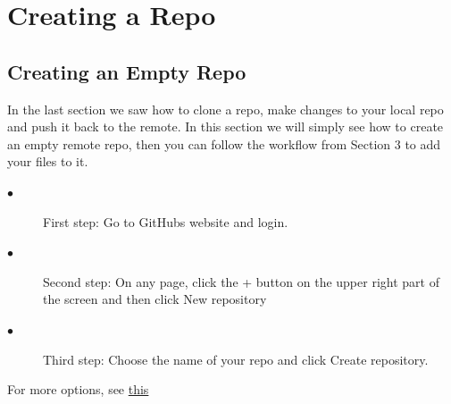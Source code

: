 \documentclass[12pt]{article}
\begin{document}
    \section{Creating a Repo}
    \subsection{Creating an Empty Repo}
    In the last section we saw how to clone a repo, make changes to your local repo and push it back to the remote. In this section we will simply see how to create an empty remote repo, then you can follow the workflow from Section 3 to add your files to it.
    \begin{description}
    \item[$\bullet$] First step: Go to GitHub\textquotesingle s website and login.
    \item[$\bullet$] Second step: On any page, click the + button on the upper right part of the screen and then click New repository 
    \item[$\bullet$] Third step: Choose the name of your repo and click Create repository. 
    \end{description}
    For more options, see \href{https://help.github.com/articles/creating-a-new-repository/}{this}
\end{document}

